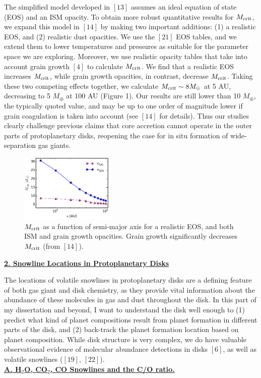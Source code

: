\documentclass[12pt, letterpaper]{article}
\begin{document}
The simplified model developed in $[13]$ assumes an ideal equation of state (EOS) and an ISM opacity. To obtain more robust quantitative results for $M_{\rm crit}$, we expand this model in $[14]$ by making two important additions: (1) a realistic EOS, and (2) realistic dust opacities. We use the $[21]$ EOS tables, and we extend them to lower temperatures and pressures as suitable for the parameter space we are exploring. Moreover, we use realistic opacity tables that take into account grain growth $[4]$ to calculate $M_{\rm crit}$. We find that a realistic EOS increases $M_{\rm crit}$, while grain growth opacities, in contrast, decrease $M_{\rm crit}$. Taking these two competing effects together, we calculate $M_{\rm crit} \sim 8 M_{\oplus}$ at 5 AU, decreasing to 5 $M_{\oplus}$ at 100 AU (Figure 1). Our results are still lower than 10 $M_{\oplus}$, the typically quoted value, and may be up to one order of magnitude lower if grain coagulation is taken into account (see $[14]$ for details). Thus our studies clearly challenge previous claims that core accretion cannot operate in the outer parts of protoplanetary disks, reopening the case for in situ formation of wide-separation gas giants. 
\begin{figure}
  \begin{center}
    \includegraphics[width=0.4\textwidth]{Mcrit_vs_a_gg}
  \end{center}
  \caption{$M_{\rm crit}$ as a function of semi-major axis for a realistic EOS, and both ISM and grain growth opacities. Grain growth significantly decreases $M_{\rm crit}$ (from $[14]$).}
\end{figure}
\underline{\textbf{2. Snowline Locations in Protoplanetary Disks}}

The locations of volatile snowlines in protoplanetary disks are a defining feature of both gas giant and disk chemistry, as they provide vital information about the abundance of these molecules in gas and dust throughout the disk. In this part of my dissertation and beyond, I want to understand the disk well enough to (1) predict what kind of planet compositions result from planet formation in different parts of the disk, and (2) back-track the planet formation location based on planet composition. While disk structure is very complex, we do have valuable observational evidence of molecular abundance detections in disks $[6]$, as well as volatile snowlines ($[19]$, $[22]$). \\
\underline{\textbf{A. H$_2$O, CO$_2$, CO Snowlines and the C/O ratio.}} 
\end{document}

